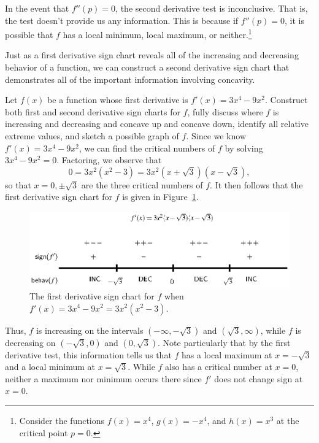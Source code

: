 \vspace*{5pt}
\nin {}
\vspace*{1pt}

In the event that $f''(p) = 0$, the second derivative test is inconclusive.  That is, the test doesn't provide us any information.  This is because if $f''(p) = 0$, it is possible that $f$ has a local minimum, local maximum, or neither.\footnote{Consider the functions $f(x) = x^4$, $g(x) = -x^4$, and $h(x) = x^3$ at the critical point $p = 0$.}

Just as a first derivative sign chart reveals all of the increasing and decreasing behavior of a function, we can construct a second derivative sign chart that demonstrates all of the important information involving concavity.

\bex \label{Ex:3.2}
Let $f(x)$ be a function whose first derivative is $f'(x) = 3x^4 - 9x^2$.  Construct both first and second derivative sign charts for $f$, fully discuss where $f$ is increasing and decreasing and concave up and concave down, identify all relative extreme values, and sketch a possible graph of $f$.
\eex
Since we know $f'(x) = 3x^4 - 9x^2$, we can find the critical numbers of $f$ by solving $3x^4 - 9x^2 = 0$.  Factoring, we observe that
$$0 = 3x^2(x^2 - 3) = 3x^2(x+\sqrt{3})(x-\sqrt{3}),$$
so that $x = 0, \pm\sqrt{3}$ are the three critical numbers of $f$.  It then follows that the first derivative sign chart for $f$ is given in Figure~\ref{F:3.1.signchart2}.
\begin{figure}[h]
\begin{center}
\includegraphics{figures/3_1_signchart2.eps}
\caption{The first derivative sign chart for $f$ when $f'(x) = 3x^4 - 9x^2 = 3x^2(x^2-3)$.} \label{F:3.1.signchart2}
\end{center}
\end{figure}
Thus, $f$ is increasing on the intervals $(-\infty, -\sqrt{3})$ and $(\sqrt{3}, \infty)$, while $f$ is decreasing on $(-\sqrt{3},0)$ and $(0, \sqrt{3})$.  Note particularly that by the first derivative test, this information tells us that $f$ has a local maximum at $x = -\sqrt{3}$ and a local minimum at $x = \sqrt{3}$.  While $f$ also has a critical number at $x = 0$, neither a maximum nor minimum occurs there since $f'$ does not change sign at $x = 0$.

